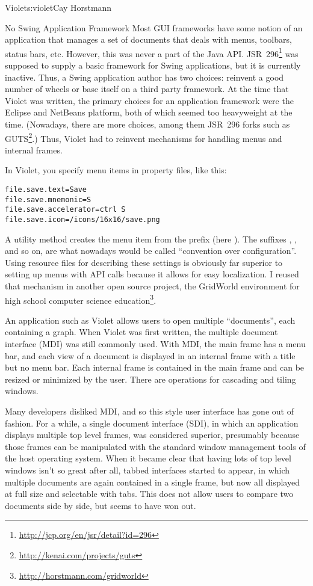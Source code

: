 \begin{aosachapter}{Violet}{s:violet}{Cay Horstmann}
\begin{aosasect1}{No Swing Application Framework}
Most GUI frameworks have some notion of an application that manages a
set of documents that deals with menus, toolbars, status bars,
etc. However, this was never a part of the Java
API\@. JSR~296\footnote{\url{http://jcp.org/en/jsr/detail?id=296}} was
supposed to supply a basic framework for Swing applications, but it is
currently inactive.  Thus, a Swing application author has two choices:
reinvent a good number of wheels or base itself on a third party
framework. At the time that Violet was written, the primary choices
for an application framework were the Eclipse and NetBeans platform,
both of which seemed too heavyweight at the time. (Nowadays, there are
more choices, among them JSR~296 forks such as
GUTS\footnote{\url{http://kenai.com/projects/guts}}.)  Thus, Violet
had to reinvent mechanisms for handling menus and internal frames.

In Violet, you specify menu items in property files, like this:

\begin{verbatim}
file.save.text=Save
file.save.mnemonic=S
file.save.accelerator=ctrl S
file.save.icon=/icons/16x16/save.png
\end{verbatim}

\noindent A utility method creates the menu item from the prefix (here
). The suffixes , , and so
on, are what nowadays would be called ``convention over
configuration''.  Using resource files for describing these settings
is obviously far superior to setting up menus with API calls because
it allows for easy localization. I reused that mechanism in another
open source project, the GridWorld environment for high school
computer science
education\footnote{\url{http://horstmann.com/gridworld}}.

An application such as Violet allows users to open multiple
``documents'', each containing a graph. When Violet was first written,
the multiple document interface (MDI) was still commonly used.  With
MDI, the main frame has a menu bar, and each view of a document is
displayed in an internal frame with a title but no menu bar. Each
internal frame is contained in the main frame and can be resized or
minimized by the user. There are operations for cascading and tiling
windows.

Many developers disliked MDI, and so this style user interface has 
gone out of fashion. For a while, a single document interface (SDI), in which an
application displays multiple top level frames, was considered
superior, presumably because those frames can be manipulated with the
standard window management tools of the host operating system. When it
became clear that having lots of top level windows isn't so great
after all, tabbed interfaces started to appear, in which multiple
documents are again contained in a single frame, but now all displayed
at full size and selectable with tabs. This does not allow users
to compare two documents side by side, but seems to have won out.


\end{aosasect1}
\end{aosachapter}
